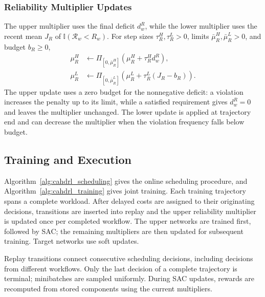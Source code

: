 \documentclass[journal]{IEEEtran}
\newcommand{\ind}{\mathbb{I}}
\begin{document}
\subsubsection{Reliability Multiplier Updates}
The upper multiplier uses the final deficit $d_w^R$, while the lower multiplier uses the recent mean $J_R$ of $\ind(\mathcal R_w<R_w)$. For step sizes $\tau_R^H,\tau_R^L>0$, limits $\bar\mu_R^H,\bar\mu_R^L>0$, and budget $b_R\geq0$,
\begin{equation}
\begin{aligned}
    \mu_R^H&\leftarrow
        \Pi_{[0,\bar\mu_R^H]}(\mu_R^H+\tau_R^H d_w^R),\\
    \mu_R^L&\leftarrow
        \Pi_{[0,\bar\mu_R^L]}
        \left(\mu_R^L+\tau_R^L(J_R-b_R)\right).
\end{aligned}
    \label{eq:method_reliability_duals}
\end{equation}
The upper update uses a zero budget for the nonnegative deficit: a violation increases the penalty up to its limit, while a satisfied requirement gives $d_w^R=0$ and leaves the multiplier unchanged. The lower update is applied at trajectory end and can decrease the multiplier when the violation frequency falls below budget.

\subsection{Training and Execution}
\label{subsec:training}

Algorithm~\ref{alg:cahdrl_scheduling} gives the online scheduling procedure, and Algorithm~\ref{alg:cahdrl_training} gives joint training. Each training trajectory spans a complete workload. After delayed costs are assigned to their originating decisions, transitions are inserted into replay and the upper reliability multiplier is updated once per completed workflow. The upper networks are trained first, followed by SAC; the remaining multipliers are then updated for subsequent training. Target networks use soft updates.

Replay transitions connect consecutive scheduling decisions, including decisions from different workflows. Only the last decision of a complete trajectory is terminal; minibatches are sampled uniformly. During SAC updates, rewards are recomputed from stored components using the current multipliers.
\end{document}
